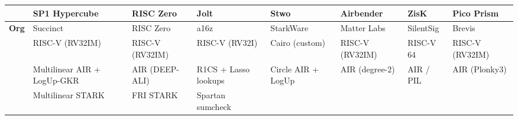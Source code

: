 \documentclass[
  11pt,
  openany]{report}
\renewcommand{\textbf}[1]{{\bfseries\color{MidnightBold}#1}}
\begin{document}
\begin{longtable}[]{@{}
  >{\raggedright\arraybackslash}p{}
  >{\raggedright\arraybackslash}p{}
  >{\raggedright\arraybackslash}p{}
  >{\raggedright\arraybackslash}p{}
  >{\raggedright\arraybackslash}p{}
  >{\raggedright\arraybackslash}p{}
  >{\raggedright\arraybackslash}p{}
  >{\raggedright\arraybackslash}p{}@{}}
\toprule\noalign{}
\begin{minipage}[b]{\linewidth}\raggedright
\end{minipage} & \begin{minipage}[b]{\linewidth}\raggedright
SP1 Hypercube
\end{minipage} & \begin{minipage}[b]{\linewidth}\raggedright
RISC Zero
\end{minipage} & \begin{minipage}[b]{\linewidth}\raggedright
Jolt
\end{minipage} & \begin{minipage}[b]{\linewidth}\raggedright
Stwo
\end{minipage} & \begin{minipage}[b]{\linewidth}\raggedright
Airbender
\end{minipage} & \begin{minipage}[b]{\linewidth}\raggedright
ZisK
\end{minipage} & \begin{minipage}[b]{\linewidth}\raggedright
Pico Prism
\end{minipage} \\
\midrule\noalign{}
\arrayrulecolor{MidnightBlue}\midrule\arrayrulecolor{MidnightBorder}
\endhead
\bottomrule\noalign{}
\endlastfoot
\textbf{Org} & Succinct & RISC Zero & a16z & StarkWare & Matter Labs & SilentSig
& Brevis \\
\textbf{ISA} & RISC-V (RV32IM) & RISC-V (RV32IM) & RISC-V (RV32I) & Cairo
(custom) & RISC-V (RV32IM) & RISC-V 64 & RISC-V (RV32IM) \\
\textbf{Arithmetization} & Multilinear AIR + LogUp-GKR & AIR (DEEP-ALI) & R1CS +
Lasso lookups & Circle AIR + LogUp & AIR (degree-2) & AIR / PIL & AIR
(Plonky3) \\
\textbf{Proof system} & Multilinear STARK & FRI STARK & Spartan sumcheck &

\end{longtable}
\end{document}
